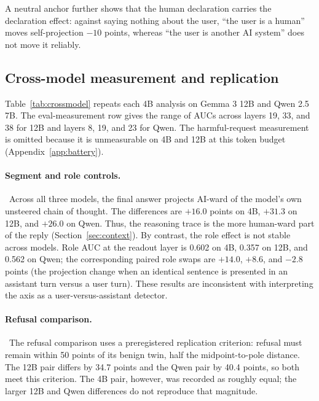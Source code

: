 A neutral anchor further shows that the human declaration carries the
declaration effect: against saying nothing about the user, ``the user is a
human'' moves self-projection $-10$ points, whereas ``the user is another AI
system'' does not move it reliably.

\subsection{Cross-model measurement and replication}
\label{app:crossmodelrepl}

Table~\ref{tab:crossmodel} repeats each 4B analysis on Gemma 3 12B and
Qwen 2.5 7B. The eval-measurement row gives the range of AUCs across layers 19,
33, and 38 for 12B and layers 8, 19, and 23 for Qwen. The harmful-request
measurement is omitted because it is unmeasurable on 4B and 12B at this token
budget (Appendix~\ref{app:battery}).

\paragraph{Segment and role controls.}~Across all three models, the final answer projects AI-ward of the model's own
unsteered chain of thought. The differences are $+16.0$ points on 4B, $+31.3$
on 12B, and $+26.0$ on Qwen. Thus, the reasoning trace is the more human-ward
part of the reply (Section~\ref{sec:context}). By contrast, the role effect is
not stable across models. Role AUC at the readout layer is 0.602 on 4B, 0.357 on
12B, and 0.562 on Qwen; the corresponding paired role swaps are $+14.0$,
$+8.6$, and $-2.8$ points (the projection change when an identical sentence is
presented in an assistant turn versus a user turn). These results are inconsistent with interpreting the
axis as a user-versus-assistant detector.

\paragraph{Refusal comparison.}~The refusal comparison uses a preregistered replication criterion: refusal must
remain within 50 points of its benign twin, half the midpoint-to-pole distance.
The 12B pair differs by 34.7 points and the Qwen pair by 40.4 points, so both
meet this criterion. The 4B pair, however, was recorded as roughly equal; the
larger 12B and Qwen differences do not reproduce that magnitude.

